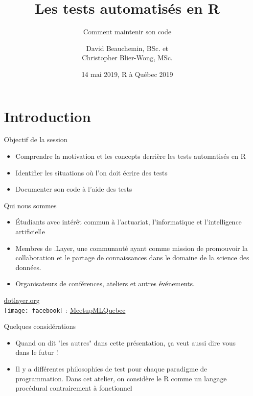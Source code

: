 \documentclass[11pt]{beamer}
\title[Les tests automatis\'es en R]{Les tests automatis\'es en R}
\subtitle{Comment maintenir son code}
\author[D. Beauchemin \& C. Blier-Wong]{David Beauchemin, BSc. et \\ Christopher Blier-Wong, MSc.}
\institute[.Layer]
{
	.Layer, Université Laval, CRDM, GRAAL
}
\date{14 mai 2019, R à Québec 2019}
\begin{document}
\begin{frame}[label=titre, plain]
\titlepage
\end{frame}

\section[Introduction]{Introduction}

\begin{frame}{Objectif de la session}
\begin{itemize}
	\item Comprendre la motivation et les concepts derrière les tests automatisés en \textsf{R}
	\item Identifier les situations où l'on doit écrire des tests
	\item Documenter son code à l'aide des tests
\end{itemize}
\end{frame}


\begin{frame}{Qui nous sommes}
\begin{itemize}
	\item Étudiants avec intérêt commun à l'actuariat, l'informatique et l'intelligence artificielle
	\item Membres de .Layer, une communauté ayant comme mission de promouvoir la collaboration et le partage de connaissances dans le domaine de la science des données.
	\item Organisateurs de conférences, ateliers et autres événements.
\end{itemize}
\begin{center}
	\href{dotlayer.org}{dotlayer.org}\\
	\texttt{[image: facebook]} : \href{https://www.facebook.com/MeetupMLQuebec/}{MeetupMLQuebec}
\end{center}
\end{frame}

\begin{frame}{Quelques considérations}
\begin{itemize}
\item Quand on dit "les autres" dans cette présentation, ça veut aussi dire vous dans le futur !
\item Il y a différentes philosophies de test pour chaque paradigme de programmation. Dans cet atelier, on considère le \textsf{R} comme un langage procédural contrairement à fonctionnel
\end{itemize}
\end{frame}
\end{document}
